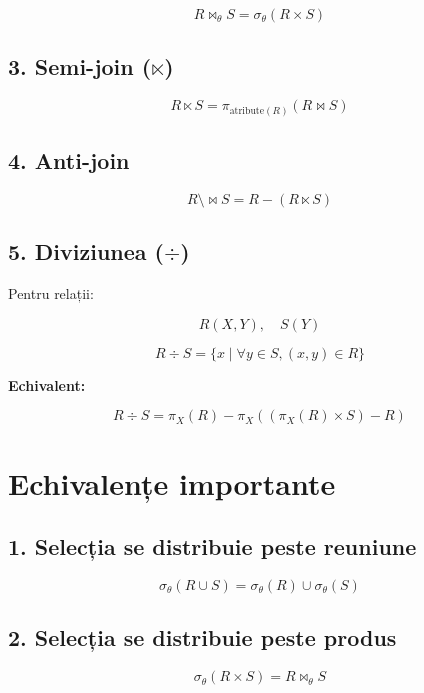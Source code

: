 \documentclass[12pt,a4paper]{article}
\begin{document}
\[
R \bowtie_{\theta} S = \sigma_{\theta}(R \times S)
\]



\subsection{3. Semi-join ($\ltimes$)}


\[
R \ltimes S = \pi_{\text{atribute}(R)}(R \bowtie S)
\]



\subsection{4. Anti-join}


\[
R \setminus\!\!\bowtie S = R - (R \ltimes S)
\]



\subsection{5. Diviziunea ($\div$)}
Pentru relații:


\[
R(X,Y), \quad S(Y)
\]





\[
R \div S = \{ x \mid \forall y \in S, (x,y) \in R \}
\]



\textbf{Echivalent:}


\[
R \div S = \pi_X(R) - \pi_X((\pi_X(R) \times S) - R)
\]



\section{Echivalențe importante}

\subsection{1. Selecția se distribuie peste reuniune}


\[
\sigma_{\theta}(R \cup S) = \sigma_{\theta}(R) \cup \sigma_{\theta}(S)
\]



\subsection{2. Selecția se distribuie peste produs}


\[
\sigma_{\theta}(R \times S) = R \bowtie_{\theta} S
\]
\end{document}
